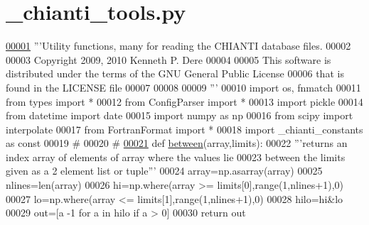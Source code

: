 \hypertarget{__chianti__tools_8py_source}{}\section{\+\_\+chianti\+\_\+tools.\+py}
\label{__chianti__tools_8py_source}

\begin{DoxyCode}
\hypertarget{__chianti__tools_8py_source_l00001}{}\hyperlink{namespacepyneb_1_1utils_1_1__chianti__tools}{00001} \textcolor{stringliteral}{'''Utility functions, many for reading the CHIANTI database files.}
00002 \textcolor{stringliteral}{}
00003 \textcolor{stringliteral}{Copyright 2009, 2010 Kenneth P. Dere}
00004 \textcolor{stringliteral}{}
00005 \textcolor{stringliteral}{This software is distributed under the terms of the GNU General Public License}
00006 \textcolor{stringliteral}{that is found in the LICENSE file}
00007 \textcolor{stringliteral}{}
00008 \textcolor{stringliteral}{}
00009 \textcolor{stringliteral}{'''}
00010 \textcolor{keyword}{import} os, fnmatch
00011 \textcolor{keyword}{from} types \textcolor{keyword}{import} *
00012 \textcolor{keyword}{from} ConfigParser \textcolor{keyword}{import} *
00013 \textcolor{keyword}{import} pickle
00014 \textcolor{keyword}{from} datetime \textcolor{keyword}{import} date
00015 \textcolor{keyword}{import} numpy \textcolor{keyword}{as} np
00016 \textcolor{keyword}{from} scipy \textcolor{keyword}{import} interpolate
00017 \textcolor{keyword}{from} FortranFormat \textcolor{keyword}{import} *
00018 \textcolor{keyword}{import} \_chianti\_constants \textcolor{keyword}{as} const
00019 \textcolor{comment}{#}
00020 \textcolor{comment}{#}
\hypertarget{__chianti__tools_8py_source_l00021}{}\hyperlink{namespacepyneb_1_1utils_1_1__chianti__tools_a46b8e5a174144ca33b476e2ea883403a}{00021} \textcolor{keyword}{def }\hyperlink{namespacepyneb_1_1utils_1_1__chianti__tools_a46b8e5a174144ca33b476e2ea883403a}{between}(array,limits):
00022     \textcolor{stringliteral}{'''returns an index array of elements of array where the values lie}
00023 \textcolor{stringliteral}{    between the limits given as a 2 element list or tuple'''}
00024     array=np.asarray(array)
00025     nlines=len(array)
00026     hi=np.where(array >= limits[0],range(1,nlines+1),0)
00027     lo=np.where(array <= limits[1],range(1,nlines+1),0)
00028     hilo=hi&lo
00029     out=[a -1  \textcolor{keywordflow}{for} a \textcolor{keywordflow}{in} hilo \textcolor{keywordflow}{if} a > 0]
00030     \textcolor{keywordflow}{return} out

\end{DoxyCode}
